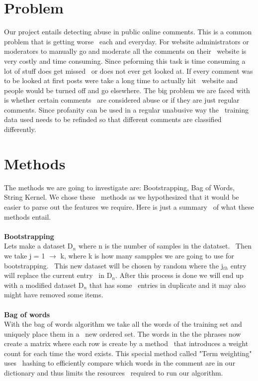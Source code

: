 \documentclass[twoside]{article}
\begin{document}
\begin{multicols}{2} %

\section{Problem}
Our project entails detecting abuse in public online comments.  This is a common problem that is getting worse \
each and everyday.  For website administrators or moderators to manually go and moderate all the comments on their \
website is very costly and time consuming.  Since peforming this task is time consuming a lot of stuff does get missed \
or does not ever get looked at.  If every comment was to be looked at first posts were take a long time to actually hit \
website and people would be turned off and go elsewhere.  The big problem we are faced with is whether certain comments \
are considered abuse or if they are just regular comments.  Since profanity can be used in a regular unabusive way the \
training data used needs to be refinded so that different comments are classified differently.


\section{Methods}

The methods we are going to investigate are: Bootstrapping, Bag of Words, String Kernel.  We chose these \
methods as we hypothesized that it would be easier to parse out the features we require.  Here is just a summary \
of what these methods entail.\
\\
\\
\textbf{Bootstrapping}\\
Lets make a dataset D$_{n}$ where n is the number of samples in the datatset.  \
Then we take j = 1 $\rightarrow$ k, where k is how many sampples we are going to use for bootstrapping.  \
This new dataset will be chosen by random where the j$_{th}$ entry will replace the current entry \
in D$_{n}$.  After this process is done we will end up with a modified dataset D$_{n}$ that has some \
entries in duplicate and it may also might have removed some items.
\\
\\
\textbf{Bag of words}\\
With the bag of words algorithm we take all the words of the training set and uniquely place them in a \
new ordered set.  The words in the the phrases now create a matrix where each row is create by a method \
that introduces a weight count for each time the word exists.  This special method called "Term weighting" uses \
hashing to efficiently compare which words in the comment are in our dictionary and thus limits the resources \
required to run our algorithm.  \


\end{multicols}
\end{document}
